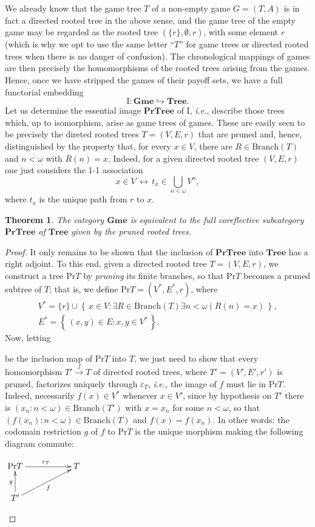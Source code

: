 \documentclass[12pt]{amsart}
\newtheorem{thm}{Theorem}[section]
\theoremstyle{definition}
\newcommand{\set}[1]{\left\{\, {#1} \,\right\}}
\newcommand{\seq}[1]{{\left( {#1} \right)}}
\newcommand{\Tree}{\mathbf{Tree}}
\newcommand{\PrTree}{\mathbf{PrTree}}
\newcommand{\Gmes}{\mathbf{Gme}}
\newcommand{\Br}{\mathrm{Branch}}
\begin{document}
We already know that the game tree $T$ of a non-empty game $G=(T,A)$ is in fact a directed rooted tree in the above sense, and the game tree of the empty game may be regarded as the rooted tree $(\{r\},\emptyset,r)$, with some element $r$ (which is why we opt to use the same letter ``$T$'' for game trees or directed rooted trees when there is no danger of confusion). The chronological mappings of games are then precisely the homomorphisms of the rooted trees arising from the games. Hence, once we have stripped the games of their payoff sets, we have a full functorial embedding 
\[
\mathrm{I}\colon\Gmes\hookrightarrow\Tree. 
\]
Let us determine the essential image  $\PrTree$ of $\mathrm{I}$, \textit{i.e.}, describe those trees which, up to isomorphism, arise as game trees of games. These are easily seen to be  precisely the direted rooted trees $T=(V,E,r)$ that are pruned and, hence, distinguished by the property that, for every $x\in V$, there are $R\in \Br(T)$ and $n<\omega$ with $R(n)=x$. Indeed, for a given directed rooted tree $(V,E,r)$ one just considers the 1-1 association 
\[x\in V \,\longleftrightarrow\, t_x\in \bigcup_{n<\omega}V^n, \]
where $t_x$ is the unique path from $r$ to $x$.

\begin{thm}\label{THM_GmeTree}
	The category $\Gmes$ is equivalent to the full coreflective subcategory $\PrTree$ of $\Tree$ given by the pruned rooted trees.
\end{thm}
\begin{proof}
	It only remains to be shown that the inclusion of $\PrTree$ into $\Tree$ has a right adjoint. To this end, 
	given a directed rooted tree $T=(V,E,r)$, we construct a tree $\mathrm{Pr}T$ by \textit{pruning} its finite branches, so that $\mathrm{Pr}T$ becomes a pruned subtree of $T$; that is,		
	we define $\mathrm{Pr}T=(V^*,E^*,r)$, where		
	\begin{gather*}
		V^* = \{r\}\cup\set{x\in V: \exists R\in \Br(T) \exists n<\omega (R(n) = x)},\\
		E^* = \set{(x,y)\in E: x,y\in V^*}.
	\end{gather*}
	Now, letting  be  the inclusion map of $\mathrm{Pr}T$ into $T$, we just need to show that every homomorphism $T'\stackrel{f}{\to} T$ of directed rooted trees, where $ T'=(V',E',r')$ is pruned, factorizes uniquely through	 $\varepsilon_T$, \textit{i.e.,} the  image of $f$ must lie in $\mathrm{Pr}T$. 
	Indeed, necessarily $f(x)\in V^*$ whenever $x\in V'$, since by hypothesis on $T'$ there is $\seq{x_n: n<\omega}\in \Br(T')$ with $x = x_n$ for some $n<\omega$, so that $\seq{f(x_n):n<\omega}\in \Br(T)$ and $f(x) = f(x_n)$. In other words: the codomain restriction $g$ of $f$ to $\mathrm{Pr}T$
	is the unique morphism making the following diagram commute:
	\begin{center}
		$\xymatrix{\mathrm{Pr}T\ar[rr]^{\varepsilon_T}&& T\\
			T'\ar[u]^g\ar[rru]_f &&\\
		}$
	\end{center}
\end{proof}
\end{document}

